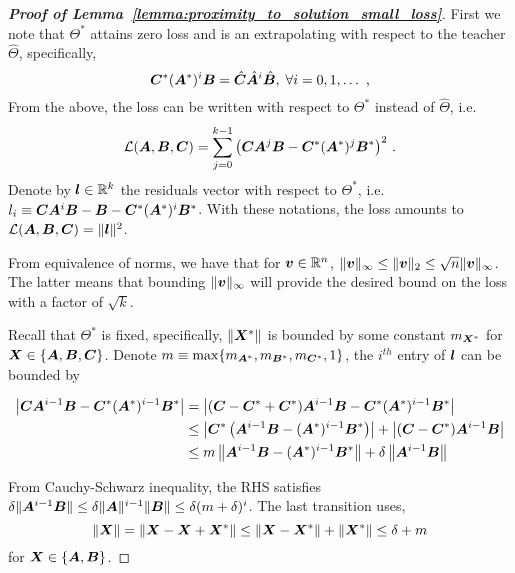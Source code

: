 \begin{proof}[\textbf{Proof of Lemma~\ref{lemma:proximity_to_solution_small_loss}}]
First we note that $\Theta^*$ attains zero loss and is an extrapolating with respect to the teacher $\hat{\Theta}$, specifically,
\begin{equation}
    {\bm{C}}^*({\bm{A}}^*)^i{\bm{B}}=\hat{{\bm{C}}}\hat{{\bm{A}}}^i\hat{{\bm{B}}},\; \forall i=0,1,\dots\text{ ,}
\end{equation}
From the above, the loss can be written with respect to $\Theta^*$ instead of $\hat{\Theta}$, i.e.
\begin{equation}
    \mathcal{L}({\bm{A}},{\bm{B}},{\bm{C}})=\sum_{j=0}^{k-1} \left({\bm{C}}{\bm{A}}^j {\bm{B}}-{\bm{C}}^*({\bm{A}}^*)^j{\bm{B}}^*\right)^2
    \text{\,.}
\end{equation}
Denote by ${\bm{l}}\in\mathbb{R}^k$ the residuals vector with respect to $\Theta^*$, i.e. ${l}_i\equiv{\bm{C}}{\bm{A}}^i{\bm{B}}-{\bm{B}}-{\bm{C}}^*({\bm{A}}^*)^i{\bm{B}}^*$. With these notations, the loss amounts to $\mathcal{L}({\bm{A}},{\bm{B}},{\bm{C}})=\|{\bm{l}}\|^2$.

From equivalence of norms, we have that for ${\bm{v}}\in\mathbb{R}^n$, $\|{\bm{v}}\|_{\infty}\le\|{\bm{v}}\|_2\le\sqrt{n}\|{\bm{v}}\|_{\infty}$. The latter means that bounding $\|{\bm{v}}\|_{\infty}$ will provide the desired bound on the loss with a factor of $\sqrt{k}$.

Recall that $\Theta^*$ is fixed, specifically, $\|{\bm{X}}^*\|$ is bounded by some constant $m_{{\bm{X}}^*}$ for ${\bm{X}}\in\{{\bm{A}},{\bm{B}},{\bm{C}}\}$. Denote $m\equiv\max\{m_{{\bm{A}}^*}, m_{{\bm{B}}^*}, m_{{\bm{C}}^*},1 \}$, the $i^{th}$ entry of ${\bm{l}}$ can be bounded by

\begin{align}
    \left|{\bm{C}}{\bm{A}}^{i-1}{\bm{B}}-{\bm{C}}^*({\bm{A}}^*)^{i-1}{\bm{B}}^*\right| & = \left|({\bm{C}}-{\bm{C}}^*+{\bm{C}}^*){\bm{A}}^{i-1}{\bm{B}}-{\bm{C}}^*({\bm{A}}^*)^{i-1}{\bm{B}}^*\right|\\
    & \le \left|{\bm{C}}^*\left({\bm{A}}^{i-1}{\bm{B}}-({\bm{A}}^*)^{i-1}{\bm{B}}^*\right)\right|+\left|({\bm{C}}-{\bm{C}}^*){\bm{A}}^{i-1}{\bm{B}}\right|\\
    & \le m\left\|{\bm{A}}^{i-1}{\bm{B}}-({\bm{A}}^*)^{i-1}{\bm{B}}^*\right\|+\delta\left\|{\bm{A}}^{i-1}{\bm{B}}\right\|
\end{align}

From Cauchy-Schwarz inequality, the RHS satisfies $\delta\|{\bm{A}}^{i-1}{\bm{B}}\|\le \delta\|{\bm{A}}\|^{i-1}\|{\bm{B}}\|\le \delta(m+\delta)^i$. The last transition uses, 
\begin{equation}
    \|{\bm{X}}\|=\|{\bm{X}}-{\bm{X}}+{\bm{X}}^*\|\le \|{\bm{X}}-{\bm{X}}^*\|+\|{\bm{X}}^*\| \le\delta + m
\end{equation}
for ${\bm{X}}\in\{{\bm{A}},{\bm{B}}\}$.


\end{proof}

